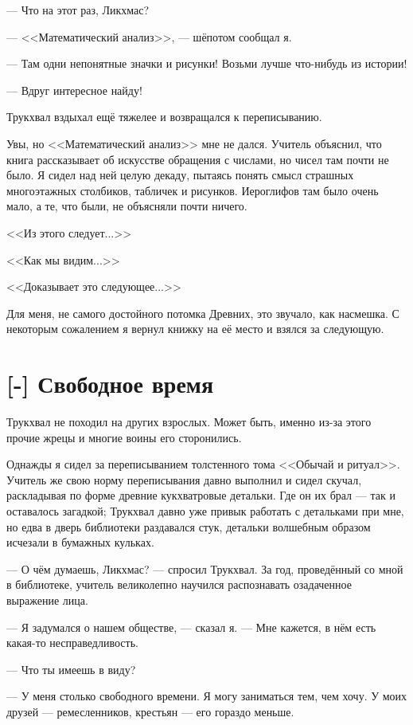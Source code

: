 --- Что на этот раз, Ликхмас?

--- <<Математический анализ>>, --- шёпотом сообщал я.

--- Там одни непонятные значки и рисунки!
Возьми лучше что-нибудь из истории!

--- Вдруг интересное найду!

Трукхвал вздыхал ещё тяжелее и возвращался к переписыванию.

Увы, но <<Математический анализ>> мне не дался.
Учитель объяснил, что книга рассказывает об искусстве обращения с числами, но чисел там почти не было.
Я сидел над ней целую декаду, пытаясь понять смысл страшных многоэтажных столбиков, табличек и рисунков.
Иероглифов там было очень мало, а те, что были, не объясняли почти ничего.

<<Из этого следует...>>

<<Как мы видим...>>

<<Доказывает это следующее...>>

Для меня, не самого достойного потомка Древних, это звучало, как насмешка.
С некоторым сожалением я вернул книжку на её место и взялся за следующую.

\section{[-] Свободное время}

\textspace

Трукхвал не походил на других взрослых.
Может быть, именно из-за этого прочие жрецы и многие воины его сторонились.

Однажды я сидел за переписыванием толстенного тома <<Обычай и ритуал>>.
Учитель же свою норму переписывания давно выполнил и сидел скучал, раскладывая по форме древние кукхватровые детальки.
Где он их брал --- так и оставалось загадкой;
Трукхвал давно уже привык работать с детальками при мне, но едва в дверь библиотеки раздавался стук, детальки волшебным образом исчезали в бумажных кульках.

--- О чём думаешь, Ликхмас? --- спросил Трукхвал.
За год, проведённый со мной в библиотеке, учитель великолепно научился распознавать озадаченное выражение лица.

--- Я задумался о нашем обществе, --- сказал я.
--- Мне кажется, в нём есть какая-то несправедливость.

--- Что ты имеешь в виду?

--- У меня столько свободного времени.
Я могу заниматься тем, чем хочу.
У моих друзей --- ремесленников, крестьян --- его гораздо меньше.

